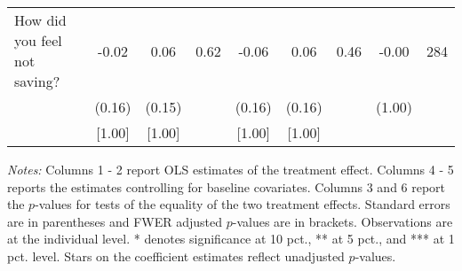 \begin{table}[htbp]
{\begin{threeparttable}
\begin{tabular}{l*{8}{c}}
How did you feel not saving?&    -0.02&     0.06&     0.62&    -0.06&     0.06&     0.46&    -0.00&      284\\
          &   (0.16)&   (0.15)&         &   (0.16)&   (0.16)&         &   (1.00)&         \\
          &   [1.00]&   [1.00]&         &   [1.00]&   [1.00]&         &         &         \\
\bottomrule \end{tabular} \begin{tablenotes}[flushleft] \footnotesize \item \emph{Notes:} Columns 1 - 2 report OLS estimates of the treatment effect. Columns 4 - 5 reports the estimates controlling for baseline covariates. Columns 3 and 6 report the \(p\)-values for tests of the equality of the two treatment effects. Standard errors are in parentheses and FWER adjusted \(p\)-values are in brackets. Observations are at the individual level. * denotes significance at 10 pct., ** at 5 pct., and *** at 1 pct. level. Stars on the coefficient estimates reflect unadjusted \(p\)-values. \end{tablenotes} \end{threeparttable} } \end{table}

